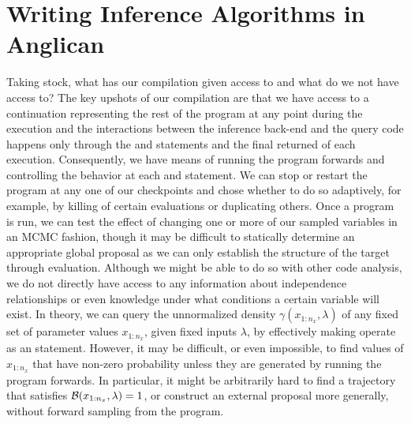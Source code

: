 
\section{Writing Inference Algorithms in Anglican}
\label{sec:proginf:inf}

Taking stock, what has our compilation
given access to and what do we not have access to?  The key upshots of our compilation are
that we have access to a continuation representing the rest of the program at any point
during the execution and 
the interactions between the inference back-end and the query code happens only through
the \sample and \observe statements and the final returned \angstate of each execution.
Consequently, we have means of running the program
forwards and controlling the behavior at each \sample and \observe statement.  We can
stop or restart the program at any one of our checkpoints and chose whether to do so
adaptively, for example, by killing of certain evaluations or duplicating others.  Once
a program is run, we can test the effect of changing one or more of our sampled variables
in an MCMC fashion, though it may be difficult to statically determine an appropriate global proposal
as we can only establish the structure of the target through evaluation.  Although we might be
able to do so with other code analysis, we do not directly have access to any information
about independence relationships or even knowledge under what conditions a certain
variable will exist.  
In theory, we can query the unnormalized density $\gamma(x_{1:n_x},\lambda)$ of any fixed set of 
parameter values $x_{1:n_x}$, given fixed inputs $\lambda$, by effectively making
\sample operate as an \observe statement.  However, it may be difficult, or even impossible, to find
values of $x_{1:n_x}$ that have non-zero probability unless they are generated by running
the program forwards.  In particular, it might be arbitrarily hard to find a trajectory that satisfies
$\mathcal{B}(x_{1:n_x},\lambda)=1$, or construct an external proposal more generally,
 without forward sampling from the program.  


